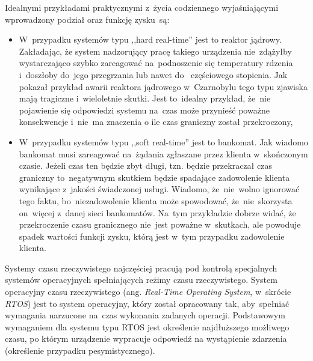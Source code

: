Idealnymi przykładami praktycznymi z~życia codziennego wyjaśniającymi wprowadzony podział oraz funkcję zysku~są:
\begin{itemize}
\item W~przypadku systemów typu  ,,hard real-time'' jest to reaktor jądrowy. Zakładając, że system nadzorujący pracę takiego urządzenia nie~zdążyłby wystarczająco szybko zareagować na~podnoszenie się temperatury rdzenia i~doszłoby do~jego przegrzania lub nawet do~ częściowego stopienia. Jak pokazał przykład awarii reaktora jądrowego w~Czarnobylu tego typu zjawiska mają tragiczne i~wieloletnie skutki. Jest to~idealny przykład, że~nie pojawienie się odpowiedzi systemu na~czas może przynieść poważne konsekwencje i~nie~ma znaczenia o ile czas graniczny został przekroczony,
\item W~przypadku systemów typu  ,,soft real-time'' jest to bankomat. Jak wiadomo bankomat musi zareagować na~żądania zgłaszane przez klienta w~skończonym czasie. Jeżeli czas ten będzie zbyt długi, tzn. będzie przekraczał czas graniczny to~negatywnym skutkiem będzie spadające zadowolenie klienta wynikające z~jakości świadczonej usługi. Wiadomo, że~nie~wolno ignorować tego faktu, bo~niezadowolenie klienta może spowodować, że~nie~skorzysta on~więcej z~danej sieci bankomatów. Na~tym przykładzie dobrze widać, że przekroczenie czasu granicznego nie~jest poważne w~skutkach, ale powoduje spadek wartości funkcji zysku, którą jest w~tym przypadku zadowolenie klienta.
\end{itemize}
\clearpage
Systemy czasu rzeczywistego najczęściej pracują pod kontrolą specjalnych systemów operacyjnych spełniających reżimy czasu rzeczywistego. System operacyjny czasu rzeczywistego (ang. \textit{Real-Time Operating System}, w~skrócie \textit{RTOS}) jest to system operacyjny, który został opracowany tak, aby~spełniać wymagania narzucone na~czas wykonania zadanych operacji. Podstawowym wymaganiem dla systemu typu RTOS jest określenie najdłuższego możliwego czasu, po którym urządzenie wypracuje odpowiedź na wystąpienie zdarzenia (określenie przypadku pesymistycznego). 

